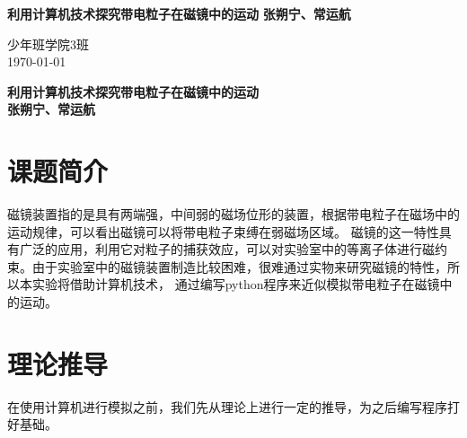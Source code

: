 \documentclass{ctexart}
\begin{document}
\begin{titlepage}
   \begin{center}
    \vspace*{1cm}
    \Huge
    \textbf{利用计算机技术探究带电粒子在磁镜中的运动}
    \vspace{0.3cm}
    \vfill
    \huge
    \textbf{张朔宁、常运航}\\
    \vspace{0.8cm}
    \vspace{1.5cm}
    \LARGE      
    
    少年班学院3班\\
    \today\\
   \end{center}
\end{titlepage}
\pagestyle{empty}
\begin{center}
    \huge
    \textbf{利用计算机技术探究带电粒子在磁镜中的运动}
    \\
    \vspace{0.4cm}
    \LARGE
    \vspace{0.4cm}
    \textbf{张朔宁、常运航}
\end{center}


\section{课题简介}
磁镜装置指的是具有两端强，中间弱的磁场位形的装置，根据带电粒子在磁场中的运动规律，可以看出磁镜可以将带电粒子束缚在弱磁场区域。
磁镜的这一特性具有广泛的应用，利用它对粒子的捕获效应，可以对实验室中的等离子体进行磁约束。由于实验室中的磁镜装置制造比较困难，很难通过实物来研究磁镜的特性，所以本实验将借助计算机技术，
通过编写python程序来近似模拟带电粒子在磁镜中的运动。
\section{理论推导}
在使用计算机进行模拟之前，我们先从理论上进行一定的推导，为之后编写程序打好基础。
\end{document}

